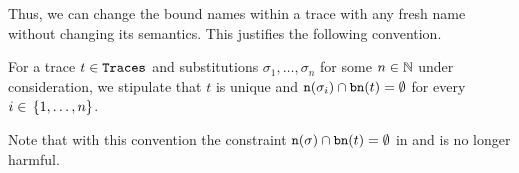 Thus, we can change the bound names within a trace with any fresh name without changing its semantics. This justifies the following convention.

\begin{conv}
\label{conv_uni_bn_traces}
For a trace $t\in\mathtt{Traces}$ and substitutions $\sigma_1,\ldots,\sigma_n$ for some $n\in\mathbb N$ under consideration, we stipulate that $t$ is unique and $\mathtt{n}(\sigma_i)\cap\mathtt{bn}(t)=\emptyset$ for every $i\in{}\set{1,\ldots,n}$.
\end{conv}

Note that with this convention the constraint $\mathtt{n}(\sigma)\cap\mathtt{bn}(t)=\emptyset$ in  and  is no longer harmful.
